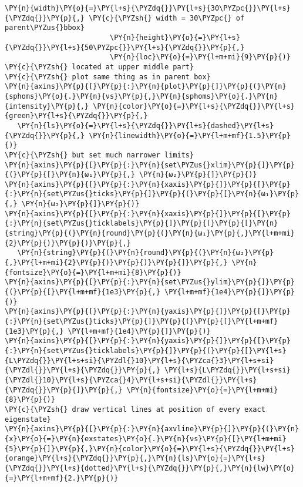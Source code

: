 \begin{Verbatim}[commandchars=\\\{\}]
                         \PY{n}{width}\PY{o}{=}\PY{l+s}{\PYZdq{}}\PY{l+s}{30\PYZpc{}}\PY{l+s}{\PYZdq{}}\PY{p}{,} \PY{c}{\PYZsh{} width = 30\PYZpc{} of parent\PYZus{}bbox}
                         \PY{n}{height}\PY{o}{=}\PY{l+s}{\PYZdq{}}\PY{l+s}{50\PYZpc{}}\PY{l+s}{\PYZdq{}}\PY{p}{,}
                         \PY{n}{loc}\PY{o}{=}\PY{l+m+mi}{9}\PY{p}{)} \PY{c}{\PYZsh{} located at upper middle part}
\PY{c}{\PYZsh{} plot same thing as in parent box}
\PY{n}{axins}\PY{p}{[}\PY{p}{:}\PY{n}{plot}\PY{p}{]}\PY{p}{(}\PY{n}{sphoms}\PY{o}{.}\PY{n}{νs}\PY{p}{,}\PY{n}{sphoms}\PY{o}{.}\PY{n}{intensity}\PY{p}{,} \PY{n}{color}\PY{o}{=}\PY{l+s}{\PYZdq{}}\PY{l+s}{green}\PY{l+s}{\PYZdq{}}\PY{p}{,}
   \PY{n}{ls}\PY{o}{=}\PY{l+s}{\PYZdq{}}\PY{l+s}{dashed}\PY{l+s}{\PYZdq{}}\PY{p}{,} \PY{n}{linewidth}\PY{o}{=}\PY{l+m+mf}{1.5}\PY{p}{)}
\PY{c}{\PYZsh{} but set much narrower limits}
\PY{n}{axins}\PY{p}{[}\PY{p}{:}\PY{n}{set\PYZus{}xlim}\PY{p}{]}\PY{p}{(}\PY{p}{[}\PY{n}{ω₁}\PY{p}{,} \PY{n}{ω₂}\PY{p}{]}\PY{p}{)}
\PY{n}{axins}\PY{p}{[}\PY{p}{:}\PY{n}{xaxis}\PY{p}{]}\PY{p}{[}\PY{p}{:}\PY{n}{set\PYZus{}ticks}\PY{p}{]}\PY{p}{(}\PY{p}{[}\PY{n}{ω₁}\PY{p}{,} \PY{n}{ω₂}\PY{p}{]}\PY{p}{)}
\PY{n}{axins}\PY{p}{[}\PY{p}{:}\PY{n}{xaxis}\PY{p}{]}\PY{p}{[}\PY{p}{:}\PY{n}{set\PYZus{}ticklabels}\PY{p}{]}\PY{p}{(}\PY{p}{[}\PY{n}{string}\PY{p}{(}\PY{n}{round}\PY{p}{(}\PY{n}{ω₁}\PY{p}{,}\PY{l+m+mi}{2}\PY{p}{)}\PY{p}{)}\PY{p}{,}
   \PY{n}{string}\PY{p}{(}\PY{n}{round}\PY{p}{(}\PY{n}{ω₂}\PY{p}{,}\PY{l+m+mi}{2}\PY{p}{)}\PY{p}{)}\PY{p}{]}\PY{p}{,} \PY{n}{fontsize}\PY{o}{=}\PY{l+m+mi}{8}\PY{p}{)}
\PY{n}{axins}\PY{p}{[}\PY{p}{:}\PY{n}{set\PYZus{}ylim}\PY{p}{]}\PY{p}{(}\PY{p}{[}\PY{l+m+mf}{1e3}\PY{p}{,} \PY{l+m+mf}{1e4}\PY{p}{]}\PY{p}{)}
\PY{n}{axins}\PY{p}{[}\PY{p}{:}\PY{n}{yaxis}\PY{p}{]}\PY{p}{[}\PY{p}{:}\PY{n}{set\PYZus{}ticks}\PY{p}{]}\PY{p}{(}\PY{p}{[}\PY{l+m+mf}{1e3}\PY{p}{,} \PY{l+m+mf}{1e4}\PY{p}{]}\PY{p}{)}
\PY{n}{axins}\PY{p}{[}\PY{p}{:}\PY{n}{yaxis}\PY{p}{]}\PY{p}{[}\PY{p}{:}\PY{n}{set\PYZus{}ticklabels}\PY{p}{]}\PY{p}{(}\PY{p}{[}\PY{l+s}{L\PYZdq{}}\PY{l+s+si}{\PYZdl{}10}\PY{l+s}{\PYZca{}3}\PY{l+s+si}{\PYZdl{}}\PY{l+s}{\PYZdq{}}\PY{p}{,} \PY{l+s}{L\PYZdq{}}\PY{l+s+si}{\PYZdl{}10}\PY{l+s}{\PYZca{}4}\PY{l+s+si}{\PYZdl{}}\PY{l+s}{\PYZdq{}}\PY{p}{]}\PY{p}{,} \PY{n}{fontsize}\PY{o}{=}\PY{l+m+mi}{8}\PY{p}{)}
\PY{c}{\PYZsh{} draw vertical lines at position of every exact eigenstate}
\PY{n}{axins}\PY{p}{[}\PY{p}{:}\PY{n}{axvline}\PY{p}{]}\PY{p}{(}\PY{n}{x}\PY{o}{=}\PY{n}{exstates}\PY{o}{.}\PY{n}{νs}\PY{p}{[}\PY{l+m+mi}{5}\PY{p}{]}\PY{p}{,}\PY{n}{color}\PY{o}{=}\PY{l+s}{\PYZdq{}}\PY{l+s}{orange}\PY{l+s}{\PYZdq{}}\PY{p}{,}\PY{n}{ls}\PY{o}{=}\PY{l+s}{\PYZdq{}}\PY{l+s}{dotted}\PY{l+s}{\PYZdq{}}\PY{p}{,}\PY{n}{lw}\PY{o}{=}\PY{l+m+mf}{2.}\PY{p}{)}

\end{Verbatim}
